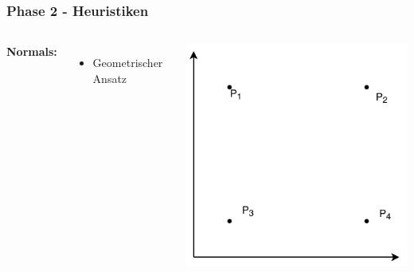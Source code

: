 \documentclass[aspectratio=169]{beamer}
\begin{document}

\begin{frame}
	\frametitle{Phase 2 - Heuristiken}
	\begin{columns}[c] %
		
		\textbf{Normals:}
		\begin{itemize}
			\item Geometrischer Ansatz
		\end{itemize}
		
		\includegraphics[scale=.7]{normals_scheme.pdf}
		
		
		
	\end{columns}
	\end{frame}
	
\end{document}
